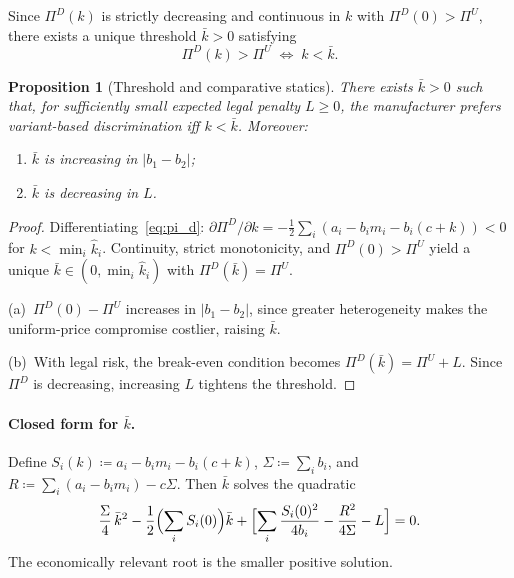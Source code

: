 \documentclass[11pt,a4paper]{article}
\theoremstyle{plain}
\newtheorem{proposition}[theorem]{Proposition}
\theoremstyle{definition}
\theoremstyle{remark}
\newcommand{\abs}[1]{\lvert #1 \rvert}
\begin{document}
Since $\Pi^D(k)$ is strictly decreasing and continuous in $k$ with $\Pi^D(0)>\Pi^U$, there exists a unique threshold $\bar{k}>0$ satisfying
\begin{equation}\label{eq:threshold}
  \Pi^D(k) > \Pi^U \;\Longleftrightarrow\; k < \bar{k}.
\end{equation}

\begin{proposition}[Threshold and comparative statics]\label{prop:threshold}
There exists $\bar{k}>0$ such that, for sufficiently small expected legal penalty $L\ge 0$, the manufacturer prefers variant-based discrimination iff $k<\bar{k}$.
Moreover:
\begin{enumerate}[nosep,label=(\alph*)]
  \item $\bar{k}$ is increasing in $\abs{b_1-b_2}$;
  \item $\bar{k}$ is decreasing in $L$.
\end{enumerate}
\end{proposition}

\begin{proof}
Differentiating~\eqref{eq:pi_d}:
$\partial\Pi^D/\partial k = -\tfrac{1}{2}\sum_i(a_i - b_i m_i - b_i(c+k)) < 0$
for $k<\min_i\hat{k}_i$.
Continuity, strict monotonicity, and $\Pi^D(0)>\Pi^U$ yield a unique $\bar{k}\in(0,\min_i\hat{k}_i)$ with $\Pi^D(\bar{k})=\Pi^U$.

(a)~$\Pi^D(0)-\Pi^U$ increases in $\abs{b_1-b_2}$, since greater heterogeneity makes the uniform-price compromise costlier, raising $\bar{k}$.

(b)~With legal risk, the break-even condition becomes $\Pi^D(\bar{k})=\Pi^U+L$. Since $\Pi^D$ is decreasing, increasing $L$ tightens the threshold.
\end{proof}

\paragraph{Closed form for $\bar{k}$.}
Define $S_i(k)\coloneqq a_i - b_i m_i - b_i(c+k)$, $\Sigma\coloneqq\sum_i b_i$, and $R\coloneqq\sum_i(a_i-b_im_i)-c\Sigma$.
Then $\bar{k}$ solves the quadratic
\begin{equation}\label{eq:kbar_quadratic}
  \frac{\Sigma}{4}\,\bar{k}^2
  - \frac{1}{2}\Bigl(\sum_i S_i(0)\Bigr)\bar{k}
  + \Bigl[\sum_i\frac{S_i(0)^2}{4b_i} - \frac{R^2}{4\Sigma} - L\Bigr] = 0.
\end{equation}
The economically relevant root is the smaller positive solution.
\end{document}
